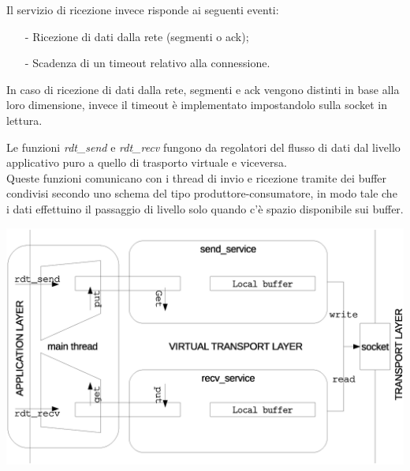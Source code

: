 

Il servizio di ricezione invece risponde ai seguenti eventi:
\begin{itemize}
\item[-]Ricezione di dati dalla rete (segmenti o ack);
\item[-]Scadenza di un timeout relativo alla connessione.
\end{itemize}
In caso di ricezione di dati dalla rete, segmenti e ack vengono distinti in 
base alla loro dimensione, invece il timeout è implementato impostandolo
sulla socket in lettura.


Le funzioni \emph{rdt\_send} e \emph{rdt\_recv} fungono da regolatori del flusso
di dati dal livello applicativo puro a quello di trasporto virtuale e 
viceversa.\\
Queste funzioni comunicano con i thread di invio e ricezione tramite 
dei buffer condivisi secondo uno schema del tipo produttore-consumatore, in 
modo tale che i dati effettuino il passaggio di livello solo quando c'è spazio
disponibile sui buffer.

\includegraphics[scale=0.35]{images/structure_1}

